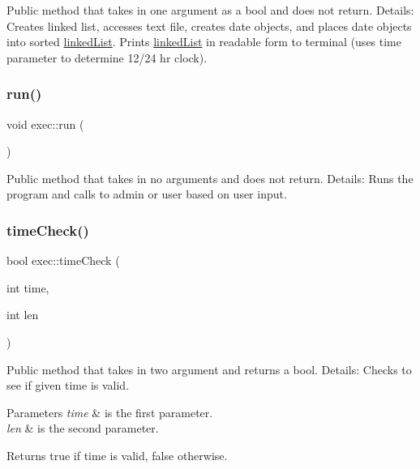 Public method that takes in one argument as a bool and does not return. Details\+: Creates linked list, accesses text file, creates date objects, and places date objects into sorted \hyperlink{classlinked_list}{linked\+List}. Prints \hyperlink{classlinked_list}{linked\+List} in readable form to terminal (uses time parameter to determine 12/24 hr clock). \mbox{\label{classexec_aad3ea9a2cd99fc28471062719b85b1f6}} 
\subsubsection{\texorpdfstring{run()}{run()}}
{\footnotesize\ttfamily void exec\+::run (\begin{DoxyParamCaption}{ }\end{DoxyParamCaption})}

Public method that takes in no arguments and does not return. Details\+: Runs the program and calls to admin or user based on user input. \mbox{\label{classexec_a7e711b54128bd8ff8039886ce4ce6fb3}} 
\subsubsection{\texorpdfstring{time\+Check()}{timeCheck()}\hspace{0.1cm}{\footnotesize\ttfamily [1/2]}}
{\footnotesize\ttfamily bool exec\+::time\+Check (\begin{DoxyParamCaption}\item[{int}]{time,  }\item[{int}]{len }\end{DoxyParamCaption})}

Public method that takes in two argument and returns a bool. Details\+: Checks to see if given time is valid. 
\begin{DoxyParams}{Parameters}
{\em time} & is the first parameter. \\
\hline
{\em len} & is the second parameter. \\
\hline
\end{DoxyParams}
\begin{DoxyReturn}{Returns}
true if time is valid, false otherwise. 
\end{DoxyReturn}
\mbox{\label{classexec_afc82b1343e127d9a7bdc36f050bdf605}} 
